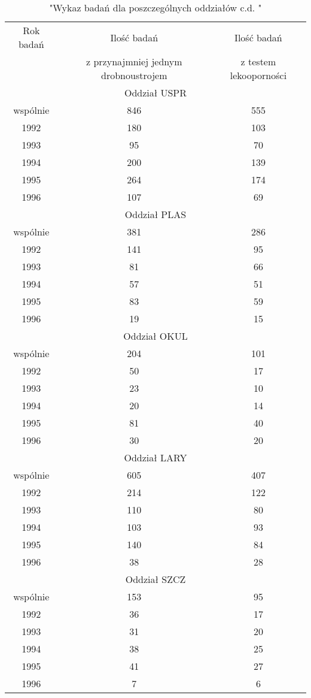 \documentclass[a4paper,11pt]{article}
\begin{document}
\begin{table}[h]
\begin{center}
\caption{"Wykaz badań dla poszczególnych oddziałów c.d. "}
\begin{tabular}{c|c|c}
\hline
Rok badań & Ilość badań & Ilość badań \\
& z przynajmniej jednym drobnoustrojem &z testem lekooporności \\

\hline \multicolumn{3}{|c|}{Oddział USPR} \\ \hline
wspólnie &846 &555 \\
1992 &180 &103 \\
1993 &95 &70 \\
1994 &200 &139 \\
1995 &264 &174 \\
1996 &107 &69 \\
\hline \multicolumn{3}{|c|}{Oddział PLAS} \\ \hline
wspólnie &381 &286 \\
1992 &141 &95 \\
1993 &81 &66 \\
1994 &57 &51 \\
1995 &83 &59 \\
1996 &19 &15 \\
\hline \multicolumn{3}{|c|}{Oddział OKUL} \\ \hline
wspólnie &204 &101 \\
1992 &50 &17 \\
1993 &23 &10 \\
1994 &20 &14 \\
1995 &81 &40 \\
1996 &30 &20 \\
\hline \multicolumn{3}{|c|}{Oddział LARY} \\ \hline
wspólnie &605 &407 \\
1992 &214 &122 \\
1993 &110 &80 \\
1994 &103 &93 \\
1995 &140 &84 \\
1996 &38 &28 \\
\hline \multicolumn{3}{|c|}{Oddział SZCZ} \\ \hline
wspólnie &153 &95 \\
1992 &36 &17 \\
1993 &31 &20 \\
1994 &38 &25 \\
1995 &41 &27 \\
1996 &7 &6 \\

\end{tabular}
\end{center}
\end{table}
\end{document}
